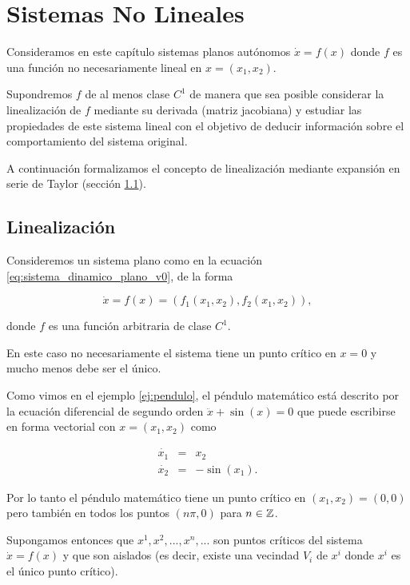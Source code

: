 \chapter{Sistemas No Lineales}
Consideramos en este capítulo sistemas planos autónomos $\dot{x} = f(x)$ donde $f$ es una función no necesariamente lineal en $x = (x_1,x_2)$.

Supondremos $f$ de al menos clase $C^1$ de manera que sea posible considerar la linealización de $f$ mediante su derivada (matriz jacobiana) y estudiar las propiedades de este sistema lineal con el objetivo de deducir información sobre el comportamiento del sistema original.

A continuación formalizamos el concepto de linealización mediante expansión en serie de Taylor (sección \ref{sec:linealizacion}).

\section{Linealización} \label{sec:linealizacion}

Consideremos un sistema plano como en la ecuación \ref{eq:sistema_dinamico_plano_v0}, de la forma

\begin{equation}
	\dot{x} = f(x) = (f_1(x_1,x_2), f_2(x_1,x_2)),
\end{equation}

donde $f$ es una función arbitraria de clase $C^1$.

En este caso no necesariamente el sistema tiene un punto crítico en $x = 0$ y mucho menos debe ser el único.

\begin{example}Como vimos en el ejemplo \ref{ej:pendulo}, el péndulo matemático está descrito por la ecuación diferencial de segundo orden $\ddot{x} + \sin(x) = 0$ que puede escribirse en forma vectorial con $x = (x_1,x_2)$ como

$$
\begin{array}{lll}
	\dot{x_1} & = & x_2 \\
	\dot{x_2} & = & -\sin(x_1).
\end{array}
$$

Por lo tanto el péndulo matemático tiene un punto crítico en $(x_1,x_2) = (0,0)$ pero también en todos los puntos $(n\pi, 0)$ para $n \in {\ensuremath{\mathbb{Z}}}$.
\end{example}

Supongamos entonces que $x^1, x^2, ..., x^n, ...$ son puntos críticos del sistema $\dot{x} = f(x)$ y que son aislados (es decir, existe una vecindad  $V_i$ de $x^i$ donde $x^i$ es el único punto crítico).

